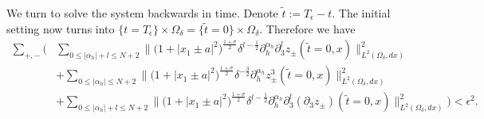 \documentclass[10pt,reqno]{amsart}
\numberwithin{equation}{section}
\begin{document}
We turn to solve the system backwards in time.
Denote $\widetilde{t}:=T_\epsilon-t$. The initial setting now turns into $\{t=T_\epsilon\}\times\Omega_{\delta}=\{\widetilde{t}=0\}\times\Omega_{\delta}$. Therefore we have
\begin{align*} 
	\sum_{+,-}\bigg(&\sum_{0\leqslant|\alpha_h|+l\leqslant N+2}\Big\|\big(1+|x_1\pm a|^2\big)^{\frac{1+\sigma}{2}}\delta^{l-\frac{1}{2}}\partial_h^{\alpha_h}\partial_3^lz_{\pm}(\widetilde{t}=0,x)\Big\|_{L^2(\Omega_{\delta},dx)}^2\\
	&+\sum_{0\leqslant|\alpha_h|\leqslant N+2}\Big\|\big(1+|x_1\pm a|^2\big)^{\frac{1+\sigma}{2}}\delta^{-\frac{3}{2}}\partial_h^{\alpha_h}z^3_{\pm}(\widetilde{t}=0,x)\Big\|_{L^2(\Omega_{\delta},dx)}^2\\
	&+\sum_{0\leqslant|\alpha_h|+l\leqslant N+2}\Big\|\big(1+|x_1\pm a|^2\big)^{\frac{1+\sigma}{2}}\delta^{l-\frac{1}{2}}\partial_h^{\alpha_h}\partial_3^l(\partial_3z_{\pm})(\widetilde{t}=0,x)\Big\|_{L^2(\Omega_{\delta},dx)}^2\bigg)<\epsilon^2.
\end{align*}
\end{document}
